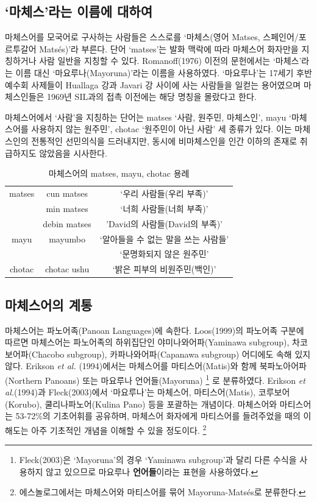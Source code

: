 \subsection{`마체스'라는 이름에 대하여}
마체스어를 모국어로 구사하는 사람들은 스스로를 `마체스(영어 Matses, 스페인어/포르투갈어 Matsés)'라 부른다. 단어 `matses'는 발화 맥락에 따라 마체스어 화자만을 지칭하거나 사람 일반을 지칭할 수 있다. Romanoff(1976) 이전의 문헌에서는 `마체스'라는 이름 대신 `마요루나(Mayoruna)'라는 이름을 사용하였다. `마요루나'는 17세기 후반 예수회 사제들이 Huallaga 강과 Javari 강 사이에 사는 사람들을 일컫는 용어였으며 마체스인들은 1969년 SIL과의 접촉 이전에는 해당 명칭을 몰랐다고 한다. 

마체스어에서 `사람'을 지칭하는 단어는 matses `사람, 원주민, 마체스인', mayu `마체스어를 사용하지 않는 원주민', chotac `원주민이 아닌 사람' 세 종류가 있다. 이는 마체스인의 전통적인 선민의식을 드러내지만, 동시에 비마체스인을 인간 이하의 존재로 취급하지도 않았음을 시사한다. 

\begin{table}
\begin{center}
\begin{tabular}{ccc}
\hline
matses	& cun matses		& `우리 사람들(우리 부족)' \\
		& min matses		& `너희 사람들(너희 부족)' \\
		& debin matses	& 'David의 사람들(David의 부족)' \\
mayu	& mayumbo		& `알아들을 수 없는 말을 쓰는 사람들' \\
		& 				& `문명화되지 않은 원주민' 	\\
chotac	& chotac ushu	& `밝은 피부의 비원주민(백인)'	\\

\hline
\end{tabular}
\caption{마체스어의 matses, mayu, chotac 용례}
\end{center}
\end{table}

\subsection{마체스어의 계통}
마체스어는 파노어족(Panoan Languages)에 속한다. Loos(1999)의 파노어족 구분에 따르면 마체스어는 파노어족의 하위집단인 야미나와어파(Yaminawa subgroup), 차코보어파(Chacobo subgroup), 카파나와어파(Capanawa subgroup) 어디에도 속해 있지 않다. Erikson \textit{et al.} (1994)에서는 마체스어를 마티스어(Matis)와 함께 북파노아어파(Northern Panoans) 또는 마요루나 언어들(Mayoruna)
\footnote{Fleck(2003)은 `Mayoruna'의 경우 `Yaminawa subgroup'과 달리 다른 수식을 사용하지 않고 있으므로 마요루나 \textbf{언어들}이라는 표현을 사용하였다.}
로 분류하였다. Erikson \textit{et al.}(1994)과 Fleck(2003)에서 `마요루나'는 마체스어, 마티스어(Matis), 코루보어(Korubo), 쿨리나파노어(Kulina Pano) 등을 포괄하는 개념이다. 마체스어와 마티스어는 53-72\%의 기초어휘를 공유하며, 마체스어 화자에게 마티스어를 들려주었을 때의 이해도는 아주 기초적인 개념을 이해할 수 있을 정도이다. 
\footnote{에스놀로그에서는 마체스어와 마티스어를 묶어 Mayoruna-Matsés로 분류한다. }

